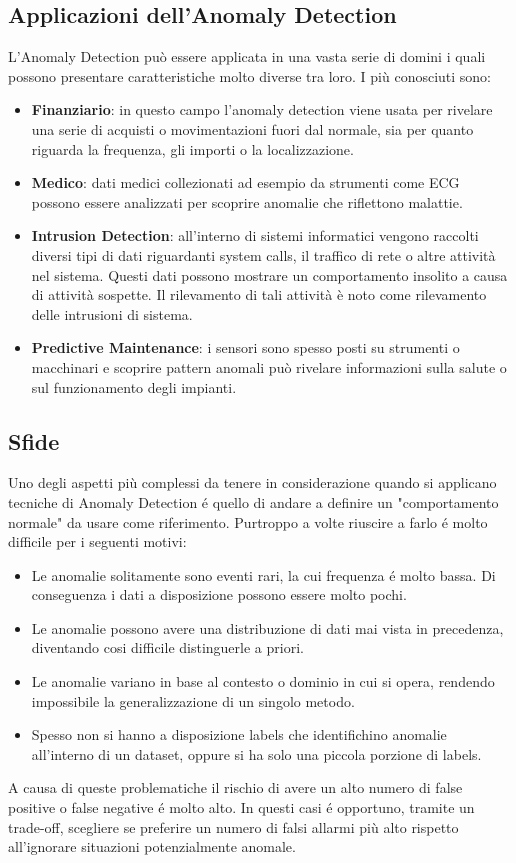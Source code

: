 \subsection{Applicazioni dell'Anomaly Detection}
L'Anomaly Detection può essere applicata in una vasta serie di domini i quali possono presentare caratteristiche molto diverse tra loro. I più conosciuti sono:
\begin{itemize}
	\item \textbf{Finanziario}: in questo campo l'anomaly detection viene usata per rivelare una serie di acquisti o movimentazioni fuori dal normale, sia per quanto riguarda la frequenza, gli importi o la localizzazione.
	\item \textbf{Medico}: dati medici collezionati ad esempio da strumenti come ECG possono essere analizzati per scoprire anomalie che riflettono malattie.
	\item \textbf{Intrusion Detection}: all'interno di sistemi informatici vengono raccolti diversi tipi di dati riguardanti system calls, il traffico di rete o altre attività nel sistema. Questi dati possono mostrare un comportamento insolito a causa di attività sospette. Il rilevamento di tali attività è noto come rilevamento delle intrusioni di sistema.
	\item \textbf{Predictive Maintenance}: i sensori sono spesso posti su strumenti o macchinari e scoprire pattern anomali può rivelare informazioni sulla salute o sul funzionamento degli impianti.
\end{itemize}

\subsection{Sfide}
Uno degli aspetti più complessi da tenere in considerazione quando si applicano tecniche di Anomaly Detection é quello di andare a definire un "comportamento normale" da usare come riferimento. Purtroppo a volte riuscire a farlo é molto difficile per i seguenti motivi:
\begin{itemize}
	\item Le anomalie solitamente sono eventi rari, la cui frequenza é molto bassa. Di conseguenza i dati a disposizione possono essere molto pochi.
	\item Le anomalie possono avere una distribuzione di dati mai vista in precedenza, diventando cosi difficile distinguerle a priori.
	\item Le anomalie variano in base al contesto o dominio in cui si opera, rendendo impossibile la generalizzazione di un singolo metodo.
	\item Spesso non si hanno a disposizione labels che identifichino anomalie all'interno di un dataset, oppure si ha solo una piccola porzione di labels.
\end{itemize}
A causa di queste problematiche il rischio di avere un alto numero di false positive o false negative é molto alto. In questi casi é opportuno, tramite un trade-off, scegliere se preferire un numero di falsi allarmi più alto rispetto all'ignorare situazioni potenzialmente anomale.

